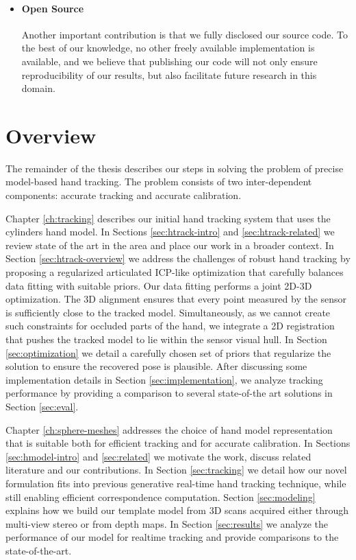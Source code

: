 \begin{itemize}
\item \paragraph{Open Source} Another important contribution is that we fully disclosed our source code. To the best of our knowledge, no other freely available implementation is available, and we believe that publishing our code will not only ensure reproducibility of our results, but also facilitate future research in this domain.

\end{itemize}

\section{Overview}

The remainder of the thesis describes our steps in solving the problem of precise model-based hand tracking. The problem consists of two inter-dependent components: accurate tracking and accurate calibration.

Chapter \ref{ch:tracking} describes our initial hand tracking system that uses the cylinders hand model. 
In Sections \ref{sec:htrack-intro} and \ref{sec:htrack-related} we review state of the art in the area and place our work in a broader context.
In Section  \ref{sec:htrack-overview} we address the challenges of robust hand tracking by proposing a regularized articulated ICP-like optimization that carefully balances data fitting with suitable priors. Our data fitting performs a joint 2D-3D optimization. The 3D alignment ensures that every point measured by the sensor is sufficiently close to the tracked model. Simultaneously, as we cannot create such constraints for occluded parts of the hand, we integrate a 2D registration that pushes the tracked model to lie within the sensor visual hull. In Section \ref{sec:optimization} we detail a carefully chosen set of priors that regularize the solution to ensure the recovered pose is plausible. After discussing some implementation details in Section \ref{sec:implementation}, we analyze tracking performance by providing a comparison to several state-of-the art solutions in Section \ref{sec:eval}.

Chapter \ref{ch:sphere-meshes} addresses the choice of hand model representation that is suitable both for efficient tracking and for accurate calibration.
In Sections \ref{sec:hmodel-intro} and \ref{sec:related} we motivate the work, discuss related literature and our contributions.
In Section \ref{sec:tracking} we detail how our novel formulation fits into previous generative real-time hand tracking technique, while still enabling efficient correspondence computation. Section \ref{sec:modeling} explains how we build our template model from 3D scans acquired either through multi-view stereo or from depth maps. In Section \ref{sec:results} we analyze the performance of our model for realtime tracking and provide comparisons to the state-of-the-art. 


